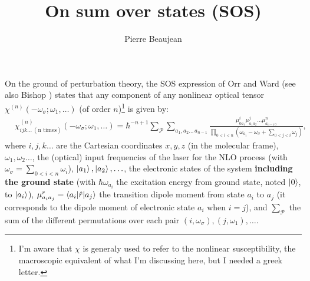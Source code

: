 \documentclass[12pt,a4paper]{article}
\title{On sum over states (SOS)}
\author{Pierre Beaujean}
\begin{document}
	\maketitle
	
	\onehalfspacing
	
	On the ground of perturbation theory, 
	the SOS expression of Orr and Ward \cite{orrPerturbationTheoryNonlinear1971} (see also Bishop \cite{bishopExplicitNondivergentFormulas1994}) states that any component of any nonlinear optical tensor $\chi^{(n)}(-\omega_\sigma;\omega_1,\ldots)$ (of order $n$)\footnote{I'm aware that $\chi$ is generaly used to refer to the nonlinear susceptibility, the macroscopic equivalent of what I'm discussing here, but I needed a greek letter.} is given by:\begin{align}
		&\chi^{(n)}_{ijk\ldots\,(\text{n times})}(-\omega_\sigma;\omega_1,\ldots) = \hbar^{-n+1}\sum_\mathcal{P}\sum_{a_1,a_2\ldots\,a_{n-1}} \frac{\mu^i_{0a_1}{\mu}^j_{a_1a_2}\ldots \mu^n_{a_{n-1\,0}}}{\prod_{0<i<n} (\omega_{a_i}-\omega_\sigma+\sum_{0<j<i} \omega_j)},\label{eq:1:sos}
	\end{align}
	where $i,j,k\ldots$ are the Cartesian coordinates $x, y, z$ (in the molecular frame), $\omega_1, \omega_2\ldots$, the (optical) input frequencies of the laser for the NLO process (with $\omega_\sigma = \sum_{0<i<n} \omega_i$), $\ket{a_1}, \ket{a_2}, \ldots$, the electronic  states of the system  \textbf{including the ground state} (with $\hbar\omega_{a_i}$ the excitation energy from ground state, noted  $\ket{0}$, to $\ket{a_i}$), $\mu^r_{a_ia_j} = \braket{a_i|\hat r|a_j}$ the transition dipole moment from state $a_i$ to $a_j$ (it corresponds to the dipole moment of electronic state $a_i$ when $i=j$), and $\sum_\mathcal{P}$ the sum of the different permutations over each pair $(i, \omega_\sigma),(j,\omega_1),\ldots$.
	
\end{document}
